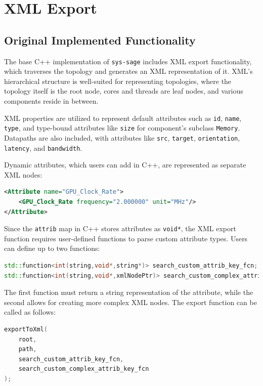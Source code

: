 \section{XML Export}

\subsection{Original Implemented Functionality}

The base C++ implementation of \verb|sys-sage| includes XML export functionality, which traverses the topology and generates an XML representation of it. XML's hierarchical structure is well-suited for representing topologies, where the topology itself is the root node, cores and threads are leaf nodes, and various components reside in between.

XML properties are utilized to represent default attributes such as \verb|id|, \verb|name|, \verb|type|, and type-bound attributes like \verb|size| for component's subclass \texttt{Memory}. Datapaths are also included, with attributes like \verb|src|, \verb|target|, \verb|orientation|, \verb|latency|, and \verb|bandwidth|.

Dynamic attributes, which users can add in C++, are represented as separate XML nodes:

\begin{lstlisting}[language=xml, xleftmargin=4em, frame = single]
<Attribute name="GPU_Clock_Rate">
    <GPU_Clock_Rate frequency="2.000000" unit="MHz"/>
</Attribute>
\end{lstlisting}

Since the \verb|attrib| map in C++ stores attributes as \verb|void*|, the XML export function requires user-defined functions to parse custom attribute types. Users can define up to two functions:

\begin{lstlisting}[language=C++, xleftmargin=4em, frame = single]
std::function<int(string,void*,string*)> search_custom_attrib_key_fcn;
std::function<int(string,void*,xmlNodePtr)> search_custom_complex_attrib_key_fcn;
\end{lstlisting}

The first function must return a string representation of the attribute, while the second allows for creating more complex XML nodes. The export function can be called as follows:

\begin{lstlisting}[language=C++, xleftmargin=4em, frame = single]
exportToXml(
    root, 
    path, 
    search_custom_attrib_key_fcn, 
    search_custom_complex_attrib_key_fcn
);
\end{lstlisting}

